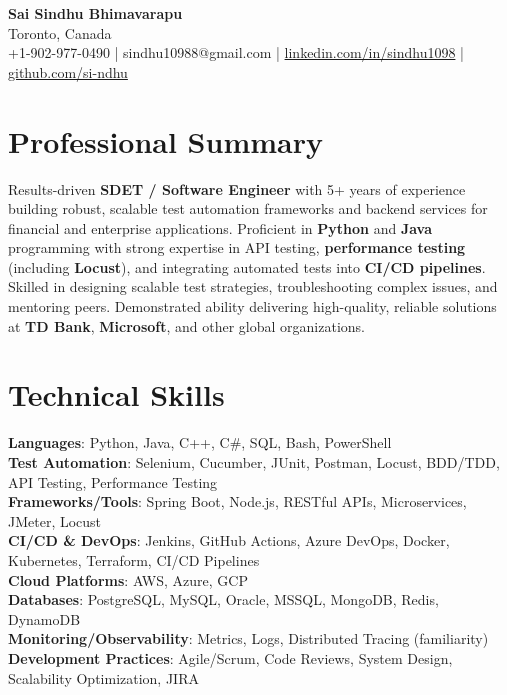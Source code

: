 \documentclass[letterpaper,11pt]{article}
\begin{document}
\begin{center}
  {\Large \textbf{Sai Sindhu Bhimavarapu}} \\
  Toronto, Canada \\
  +1-902-977-0490 \enspace | \enspace sindhu10988@gmail.com \enspace | \enspace \href{https://www.linkedin.com/in/sindhu1098/}{linkedin.com/in/sindhu1098} \enspace | \enspace \href{https://github.com/si-ndhu}{github.com/si-ndhu}
\end{center}

\section{Professional Summary}
  \begin{itemize}[leftmargin=0.15in, label={}]
    \small{\item{
     Results-driven \textbf{SDET / Software Engineer} with 5+ years of experience building robust, scalable test automation frameworks and backend services for financial and enterprise applications. Proficient in \textbf{Python} and \textbf{Java} programming with strong expertise in API testing, \textbf{performance testing} (including \textbf{Locust}), and integrating automated tests into \textbf{CI/CD pipelines}. Skilled in designing scalable test strategies, troubleshooting complex issues, and mentoring peers. Demonstrated ability delivering high-quality, reliable solutions at \textbf{TD Bank}, \textbf{Microsoft}, and other global organizations.
    }}
  \end{itemize}
\vspace{-16pt}

\section{Technical Skills}
 \begin{itemize}[leftmargin=0.15in, label={}]
    \small{\item{
     \textbf{Languages}: Python, Java, C++, C\#, SQL, Bash, PowerShell \\
     \textbf{Test Automation}: Selenium, Cucumber, JUnit, Postman, Locust, BDD/TDD, API Testing, Performance Testing \\
     \textbf{Frameworks/Tools}: Spring Boot, Node.js, RESTful APIs, Microservices, JMeter, Locust \\
     \textbf{CI/CD \& DevOps}: Jenkins, GitHub Actions, Azure DevOps, Docker, Kubernetes, Terraform, CI/CD Pipelines \\
     \textbf{Cloud Platforms}: AWS, Azure, GCP \\
     \textbf{Databases}: PostgreSQL, MySQL, Oracle, MSSQL, MongoDB, Redis, DynamoDB \\
     \textbf{Monitoring/Observability}: Metrics, Logs, Distributed Tracing (familiarity) \\
     \textbf{Development Practices}: Agile/Scrum, Code Reviews, System Design, Scalability Optimization, JIRA 
    }}
 \end{itemize}
\vspace{-16pt}
\end{document}
